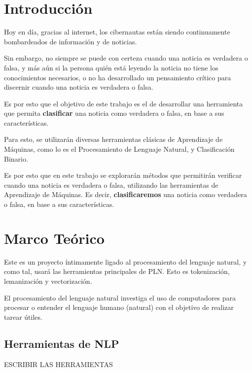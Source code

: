 \section{Introducción}
{

Hoy en día, gracias al internet, los cibernautas están siendo continuamente bombardeados de información y de noticias.

Sin embargo, no siempre se puede con certeza cuando una noticia es verdadera o falsa, y más aún si la persona quién
está leyendo la noticia no tiene los conocimientos necesarios, o no ha desarrollado un pensamiento crítico para discernir 
cuando una noticia es verdadera o falsa.

Es por esto que el objetivo de este trabajo es el de desarrollar una herramienta que permita \textbf{clasificar} una noticia como verdadera o falsa, en base a sus características.

Para esto, se utilizarán diversas herramientas clásicas de Aprendizaje de Máquinas, como lo es el Procesamiento de Lenguaje Natural, y Clasificación Binario.   


Es por esto que en este trabajo se explorarán métodos que permitirán verificar cuando una noticia es verdadera o falsa, utilizando las
herramientas de Aprendizaje de Máquinas. Es decir, \textbf{clasificaremos} una noticia como verdadera o falsa, en base a sus características.


}

\section{Marco Teórico}
{
Este es un proyecto íntimamente ligado al procesamiento del lenguaje natural, y como tal, usará las herramientas principales de PLN. Esto es tokenización, lemanización y vectorización. 

El procesamiento del lenguaje natural investiga el uso de computadores para procesar o entender el lenguaje humano (natural) con el objetivo de realizar tarear útiles.  

\subsection{Herramientas de NLP}
ESCRIBIR LAS HERRAMIENTAS

}

